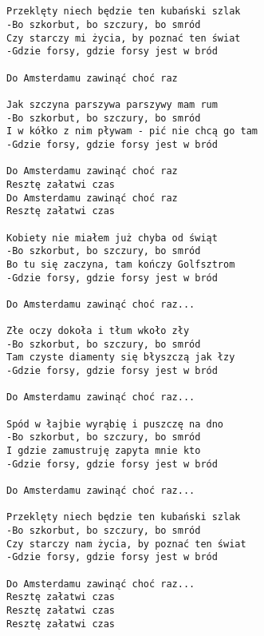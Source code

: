 \documentclass[12pt]{article}
\begin{document}
\subsection*{}
\begin{verbatim}
Przeklęty niech będzie ten kubański szlak
-Bo szkorbut, bo szczury, bo smród
Czy starczy mi życia, by poznać ten świat
-Gdzie forsy, gdzie forsy jest w bród

Do Amsterdamu zawinąć choć raz

Jak szczyna parszywa parszywy mam rum
-Bo szkorbut, bo szczury, bo smród
I w kółko z nim pływam - pić nie chcą go tam
-Gdzie forsy, gdzie forsy jest w bród

Do Amsterdamu zawinąć choć raz
Resztę załatwi czas
Do Amsterdamu zawinąć choć raz
Resztę załatwi czas

Kobiety nie miałem już chyba od świąt
-Bo szkorbut, bo szczury, bo smród
Bo tu się zaczyna, tam kończy Golfsztrom
-Gdzie forsy, gdzie forsy jest w bród

Do Amsterdamu zawinąć choć raz...

Złe oczy dokoła i tłum wkoło zły
-Bo szkorbut, bo szczury, bo smród
Tam czyste diamenty się błyszczą jak łzy
-Gdzie forsy, gdzie forsy jest w bród

Do Amsterdamu zawinąć choć raz...

Spód w łajbie wyrąbię i puszczę na dno
-Bo szkorbut, bo szczury, bo smród
I gdzie zamustruję zapyta mnie kto
-Gdzie forsy, gdzie forsy jest w bród

Do Amsterdamu zawinąć choć raz...

Przeklęty niech będzie ten kubański szlak
-Bo szkorbut, bo szczury, bo smród
Czy starczy nam życia, by poznać ten świat
-Gdzie forsy, gdzie forsy jest w bród

Do Amsterdamu zawinąć choć raz...
Resztę załatwi czas
Resztę załatwi czas
Resztę załatwi czas
\end{verbatim}
\clearpage
\end{document}
